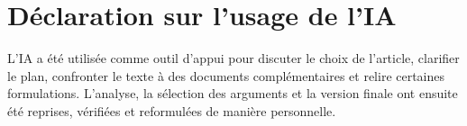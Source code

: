 \documentclass[12pt,a4paper]{article}
\begin{document}
\section*{D\'eclaration sur l'usage de l'IA}
\normalsize
L'IA a \'et\'e utilis\'ee comme outil d'appui pour discuter le choix de l'article, clarifier le plan, confronter le texte \`a des documents compl\'ementaires et relire certaines formulations. L'analyse, la s\'election des arguments et la version finale ont ensuite \'et\'e reprises, v\'erifi\'ees et reformul\'ees de mani\`ere personnelle.
\end{document}
